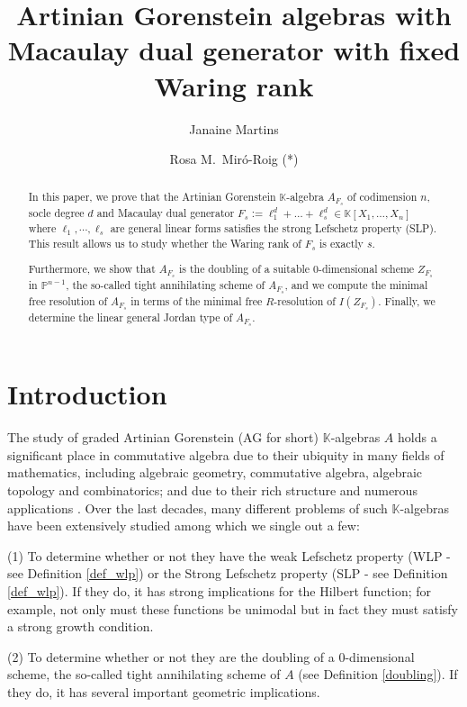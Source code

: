 \documentclass[12pt,twoside]{amsart}
\title[AG algebras with Macaulay dual generator with fixed Waring rank]{Artinian Gorenstein algebras with Macaulay dual generator with fixed Waring rank}
\author[J. Martins]{Janaine Martins}
\author[R.\ M.\ Mir\'o-Roig]{Rosa M.\ Mir\'o-Roig (*)}
\numberwithin{equation}{section} \hyphenation{semi-stable}
\newcommand{\K}{\mathbb{K}}
\theoremstyle{definition}
\begin{document}
\begin{abstract}
 In this paper, we prove that the Artinian Gorenstein $\K$-algebra $A_{F_s}$ of codimension $n$, socle degree $d$ and  Macaulay dual generator $F_s := \ell_1^d + \dots + \ell_s^d \in \mathbb{K}[X_1, \dots, X_n]$ where $\ell _1, \cdots , \ell_s$ are general linear forms satisfies the strong Lefschetz property (SLP). This result allows us to study whether the Waring rank of $F_s$ is exactly $s$.
 
 Furthermore, we show that $A_{F_s}$ is the doubling of a suitable 0-dimensional scheme $Z_{F_s}$ in $\mathbb{P}^{n-1}$, the so-called tight annihilating scheme of  $A_{F_s}$, and we compute the minimal free resolution of $A_{F_s}$ in terms of the minimal free $R$-resolution of $I(Z_{F_s})$. Finally, we determine the linear general Jordan type of $A_{F_s}$.
\end{abstract}


\maketitle



\section{Introduction}

The study of graded Artinian Gorenstein (AG for short)  $\K$-algebras $A$ holds a significant place in commutative algebra due to their ubiquity in many fields of mathematics, including algebraic geometry, commutative algebra, algebraic topology and combinatorics; and due to  their rich structure and numerous applications \cite{MW09}. Over the last decades, many different problems of such $\K$-algebras have been extensively studied among which we single out a few: 

\vskip 2mm
(1) To determine whether or not they have  the weak Lefschetz property (WLP - see Definition \ref{def_wlp}) or the Strong Lefschetz property (SLP - see Definition \ref{def_wlp}). If they do, it has strong implications for the Hilbert function;
for example, not only must these functions be unimodal but in fact they must satisfy a
strong growth condition. 

(2) To determine whether or not they are the doubling of a 0-dimensional scheme, the so-called tight annihilating scheme of $A$ (see Definition \ref{doubling}). If they do, it has several important geometric implications. 
\end{document}
